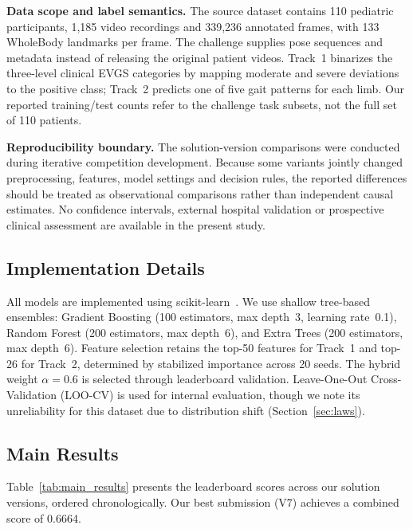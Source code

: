 \noindent\textbf{Data scope and label semantics.}
The source dataset contains 110 pediatric participants, 1,185 video recordings and 339,236 annotated frames, with 133 WholeBody landmarks per frame. The challenge supplies pose sequences and metadata instead of releasing the original patient videos. Track~1 binarizes the three-level clinical EVGS categories by mapping moderate and severe deviations to the positive class; Track~2 predicts one of five gait patterns for each limb. Our reported training/test counts refer to the challenge task subsets, not the full set of 110 patients.

\noindent\textbf{Reproducibility boundary.}
The solution-version comparisons were conducted during iterative competition development. Because some variants jointly changed preprocessing, features, model settings and decision rules, the reported differences should be treated as observational comparisons rather than independent causal estimates. No confidence intervals, external hospital validation or prospective clinical assessment are available in the present study.

\subsection{Implementation Details}
\label{sec:implementation}

All models are implemented using scikit-learn~\cite{pedregosa2011scikit}. We use shallow tree-based ensembles: Gradient Boosting (100 estimators, max depth~3, learning rate~0.1), Random Forest (200 estimators, max depth~6), and Extra Trees (200 estimators, max depth~6). Feature selection retains the top-50 features for Track~1 and top-26 for Track~2, determined by stabilized importance across 20 seeds. The hybrid weight $\alpha = 0.6$ is selected through leaderboard validation. Leave-One-Out Cross-Validation (LOO-CV) is used for internal evaluation, though we note its unreliability for this dataset due to distribution shift (\cf Section~\ref{sec:laws}).

\subsection{Main Results}
\label{sec:main_results}

Table~\ref{tab:main_results} presents the leaderboard scores across our solution versions, ordered chronologically. Our best submission (V7) achieves a combined score of 0.6664.

